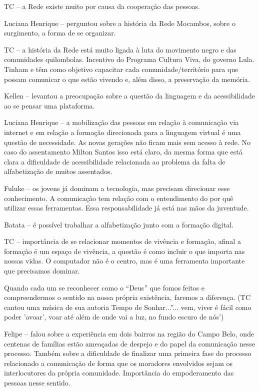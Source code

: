 \documentclass[a4paper, 11pt, oneside]{Relatorio_sem_2}  %
\begin{document}
TC – a Rede existe muito por causa da cooperação das pessoas.

Luciana Henrique – perguntou sobre a história da Rede Mocambos, sobre
o surgimento, a forma de se organizar.

TC – a história da Rede está muito ligada à luta do movimento negro e
das comunidades quilombolas. Incentivo do Programa Cultura Viva, do
governo Lula. Tinham e têm como objetivo capacitar cada
comunidade/território para que possam comunicar o que estão vivendo e,
além disso, a preservação da memória.

Kellen – levantou a preocupação sobre a questão da linguagem e da
acessibilidade ao se pensar uma plataforma.

Luciana Henrique – a mobilização das pessoas em relação à comunicação
via internet e em relação a formação direcionada para a linguagem
virtual é uma questão de necessidade. As novas gerações não ficam mais
sem acesso à rede. No caso do assentamento Milton Santos isso está
claro, da mesma forma que está clara a dificuldade de acessibilidade
relacionada ao problema da falta de alfabetização de muitos
assentados.

Fuluke – os jovens já dominam a tecnologia, mas precisam direcionar
esse conhecimento. A comunicação tem relação com o entendimento do por
quê utilizar essas ferramentas. Essa responsabilidade já está nas mãos
da juventude.

Batata – é possível trabalhar a alfabetização junto com a formação
digital.

TC – importância de se relacionar momentos de vivência e formação,
afinal a formação é um espaço de vivência, a questão é como incluir o
que importa nas nossas vidas. O computador não é o centro, mas é uma
ferramenta importante que precisamos dominar.

Quando cada um se reconhecer como o “Deus” que fomos feitos e
compreendermos o sentido na nossa própria existência, faremos a
diferença.  (TC cantou uma música de sua autoria Tempo de
Sonhar...''... vem, viver é fácil como poder 'avoar', voar até além de
onde vai a luz, no fundo escuro de nós')

Felipe – falou sobre a experiência em dois bairros na região do Campo
Belo, onde centenas de famílias estão ameaçadas de despejo e do papel
da comunicação nesse processo. Também sobre a dificuldade de finalizar
uma primeira fase do processo relacionado a comunicação de forma que
os moradores envolvidos sejam os interlocutores da própria
comunidade. Importância do empoderamento das pessoas nesse sentido.
\end{document}
